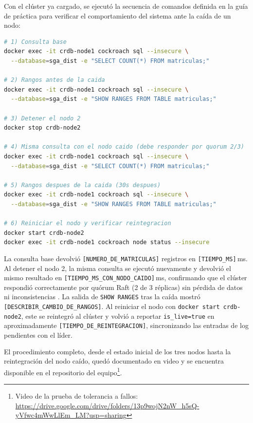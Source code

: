 \documentclass[10pt,a4paper]{article}
\begin{document}
Con el clúster ya cargado, se ejecutó la secuencia de comandos definida en
la guía de práctica para verificar el comportamiento del sistema ante la
caída de un nodo:
 
\begin{lstlisting}[language=bash, caption={Secuencia de comandos de la prueba de tolerancia a fallos}, label={lst:tolerancia}]
# 1) Consulta base
docker exec -it crdb-node1 cockroach sql --insecure \
  --database=sga_dist -e "SELECT COUNT(*) FROM matriculas;"
 
# 2) Rangos antes de la caida
docker exec -it crdb-node1 cockroach sql --insecure \
  --database=sga_dist -e "SHOW RANGES FROM TABLE matriculas;"
 
# 3) Detener el nodo 2
docker stop crdb-node2
 
# 4) Misma consulta con el nodo caido (debe responder por quorum 2/3)
docker exec -it crdb-node1 cockroach sql --insecure \
  --database=sga_dist -e "SELECT COUNT(*) FROM matriculas;"
 
# 5) Rangos despues de la caida (30s despues)
docker exec -it crdb-node1 cockroach sql --insecure \
  --database=sga_dist -e "SHOW RANGES FROM TABLE matriculas;"
 
# 6) Reiniciar el nodo y verificar reintegracion
docker start crdb-node2
docker exec -it crdb-node1 cockroach node status --insecure
\end{lstlisting}
 
 
La consulta base devolvió \texttt{[NUMERO\_DE\_MATRICULAS]} registros en
\texttt{[TIEMPO\_MS]}\,ms. Al detener el nodo 2, la misma consulta se
ejecutó nuevamente y devolvió el mismo resultado en
\texttt{[TIEMPO\_MS\_CON\_NODO\_CAIDO]}\,ms, confirmando que el clúster
respondió correctamente por quórum Raft (2 de 3 réplicas) sin pérdida de
datos ni inconsistencias \cite{ongaro2014,taft2020}. La salida de
\texttt{SHOW RANGES} tras la caída mostró \texttt{[DESCRIBIR\_CAMBIO\_DE\_RANGOS]}.
Al reiniciar el nodo con \texttt{docker start crdb-node2}, este se
reintegró al clúster y volvió a reportar \texttt{is\_live=true} en
aproximadamente \texttt{[TIEMPO\_DE\_REINTEGRACION]}, sincronizando las
entradas de log pendientes con el líder.

El procedimiento completo, desde el estado inicial de los tres nodos hasta la
reintegración del nodo caído, quedó documentado en video y se encuentra
disponible en el repositorio del equipo\footnote{Video de la prueba de
tolerancia a fallos: \url{https://drive.google.com/drive/folders/13p9wojN2nW_h5sQ-yVfwc4mWwLlEm_LM?usp=sharing}}.
 
\end{document}
